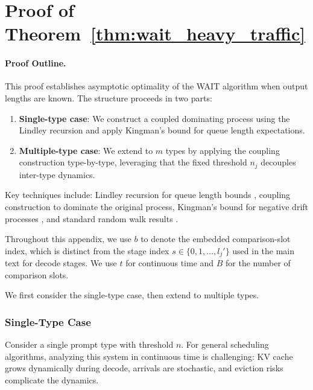 
\section{Proof of Theorem~\ref{thm:wait_heavy_traffic}}\label{appexidx::proof of wait_heavy_traffic}

\paragraph{Proof Outline.}
This proof establishes asymptotic optimality of the WAIT algorithm when output lengths are known. The structure proceeds in two parts:
\begin{enumerate}
    \item \textbf{Single-type case}: We construct a coupled dominating process using the Lindley recursion and apply Kingman's bound for queue length expectations.
    \item \textbf{Multiple-type case}: We extend to $m$ types by applying the coupling construction type-by-type, leveraging that the fixed threshold $n_j$ decouples inter-type dynamics.
\end{enumerate}
Key techniques include: Lindley recursion for queue length bounds \citep[Proposition 6.3]{asmussen2003applied}, coupling construction to dominate the original process, Kingman's bound for negative drift processes \citep{kingman1962queues}, and standard random walk results \citep{strait1974maximum}.

Throughout this appendix, we use $b$ to denote the embedded comparison-slot index, which is distinct from the stage index $s \in \{0, 1, \ldots, l_j'\}$ used in the main text for decode stages. We use $t$ for continuous time and \(B\) for the number of comparison slots.

We first consider the single-type case, then extend to multiple types.

\subsubsection{Single-Type Case}

Consider a single prompt type with threshold $n$. For general scheduling algorithms, analyzing this system in continuous time is challenging: KV cache grows dynamically during decode, arrivals are stochastic, and eviction risks complicate the dynamics.

